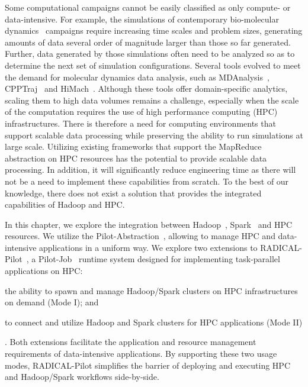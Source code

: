 Some computational campaigns cannot be easily classified as only compute- or
data-intensive. For example, the simulations of contemporary bio-molecular
dynamics~\cite{dror2012biomolecular} campaigns require increasing time scales
and problem sizes,  generating amounts of data several order of magnitude larger
than those so far generated. Further, data generated by those simulations often
need to be analyzed so as to determine the next set of simulation
configurations. Several tools evolved to meet the demand for molecular dynamics
data analysis, such as
MDAnalysis~\cite{michaud2011mdanalysis,gowers2016mdanalysis},
CPPTraj~\cite{roe2013ptraj} and HiMach~\cite{tiankai2008scalable}. Although
these tools offer domain-specific analytics, scaling them to high data volumes
remains a challenge, especially when the scale of the computation requires the
use of high performance computing (HPC) infrastructures. There is therefore a
need for computing environments that support scalable data processing while
preserving the ability to run simulations at large scale. Utilizing existing 
frameworks that support the MapReduce abstraction on HPC resources has the 
potential to provide scalable data processing. In addition, it will 
significantly reduce engineering time as there will not be a need to implement 
these capabilities from scratch. To the best of our knowledge, there does not 
exist a solution that provides the integrated capabilities of Hadoop and HPC.

In this chapter, we explore the integration between Hadoop~\cite{hadoop},
Spark~\cite{zaharia2010spark} and HPC resources. We utilize the
Pilot-Abstraction~\cite{luckow2012pstar}, allowing to manage HPC and
data-intensive applications in a uniform way. We explore two extensions to
RADICAL-Pilot~\cite{merzky2018design}, a Pilot-Job~\cite{luckow2012pstar}
runtime system designed for implementing task-parallel applications on HPC:
\begin{inparaenum}[1)]
    \item the ability to spawn and manage Hadoop/Spark clusters on HPC infrastructures on demand (Mode I); and
    \item to connect and utilize Hadoop and Spark clusters for HPC applications
    (Mode II)
\end{inparaenum}.
Both extensions facilitate the application and
resource management requirements of data-intensive applications. By supporting
these two usage modes, RADICAL-Pilot simplifies the barrier of deploying and
executing HPC and Hadoop/Spark workflows side-by-side.

